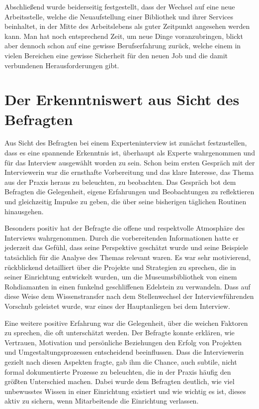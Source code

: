 \documentclass[a4paper,
fontsize=11pt,
oneside,
numbers=noperiodatend,
parskip=half-,
bibliography=totoc,
final
]{scrartcl}
\begin{document}
Abschließend wurde beiderseitig festgestellt, dass der Wechsel auf eine
neue Arbeitsstelle, welche die Neuaufstellung einer Bibliothek und ihrer
Services beinhaltet, in der Mitte des Arbeitslebens als guter Zeitpunkt
angesehen werden kann. Man hat noch entsprechend Zeit, um neue Dinge
voranzubringen, blickt aber dennoch schon auf eine gewisse
Berufserfahrung zurück, welche einem in vielen Bereichen eine gewisse
Sicherheit für den neuen Job und die damit verbundenen Herausforderungen
gibt.

\section{Der Erkenntniswert aus Sicht des
Befragten}\label{der-erkenntniswert-aus-sicht-des-befragten}

Aus Sicht des Befragten bei einem Experteninterview ist zunächst
festzustellen, dass es eine spannende Erkenntnis ist, überhaupt als
Experte wahrgenommen und für das Interview ausgewählt worden zu sein.
Schon beim ersten Gespräch mit der Interviewerin war die ernsthafte
Vorbereitung und das klare Interesse, das Thema aus der Praxis heraus zu
beleuchten, zu beobachten. Das Gespräch bot dem Befragten die
Gelegenheit, eigene Erfahrungen und Beobachtungen zu reflektieren und
gleichzeitig Impulse zu geben, die über seine bisherigen täglichen
Routinen hinausgehen.

Besonders positiv hat der Befragte die offene und respektvolle
Atmosphäre des Interviews wahrgenommen. Durch die vorbereitenden
Informationen hatte er jederzeit das Gefühl, dass seine Perspektive
geschätzt wurde und seine Beispiele tatsächlich für die Analyse des
Themas relevant waren. Es war sehr motivierend, rückblickend detailliert
über die Projekte und Strategien zu sprechen, die in seiner Einrichtung
entwickelt wurden, um die Museumsbibliothek von einem Rohdiamanten in
einen funkelnd geschliffenen Edelstein zu verwandeln. Dass auf diese
Weise dem Wissenstransfer nach dem Stellenwechsel der Interviewführenden
Vorschub geleistet wurde, war eines der Hauptanliegen bei dem Interview.

Eine weitere positive Erfahrung war die Gelegenheit, über die weichen
Faktoren zu sprechen, die oft unterschätzt werden. Der Befragte konnte
erklären, wie Vertrauen, Motivation und persönliche Beziehungen den
Erfolg von Projekten und Umgestaltungsprozessen entscheidend
beeinflussen. Dass die Interviewerin gezielt nach diesen Aspekten
fragte, gab ihm die Chance, auch subtile, nicht formal dokumentierte
Prozesse zu beleuchten, die in der Praxis häufig den größten Unterschied
machen. Dabei wurde dem Befragten deutlich, wie viel unbewusstes Wissen
in einer Einrichtung existiert und wie wichtig es ist, dieses aktiv zu
sichern, wenn Mitarbeitende die Einrichtung verlassen.
\end{document}
